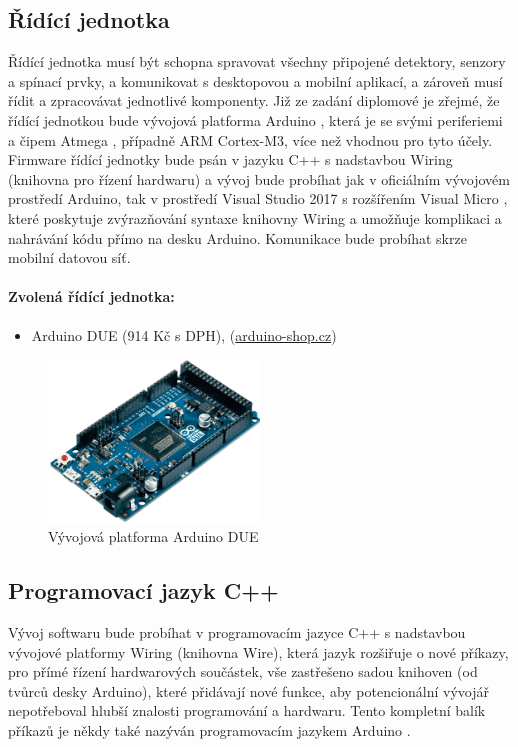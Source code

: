 \documentclass[FM,DP]{tulthesis}  %
\begin{document}
\subsection{Řídící jednotka}
Řídící jednotka musí být schopna spravovat všechny připojené detektory, senzory a spínací prvky, a komunikovat s desktopovou a mobilní aplikací, a zároveň musí řídit a zpracovávat jednotlivé komponenty. Již ze zadání diplomové je zřejmé, že řídící jednotkou bude vývojová platforma Arduino \cite{Pruvodce arduinem}, která je se svými periferiemi \cite{Arduino schematic} a čipem Atmega \cite{Atmega datasheet}, případně ARM Cortex-M3, více než vhodnou pro tyto účely. Firmware řídící jednotky bude psán v jazyku  C++ s nadstavbou Wiring (knihovna pro řízení hardwaru) \cite{Wiring} a vývoj bude probíhat jak v oficiálním vývojovém prostředí Arduino\cite{Arduino soft}, tak v prostředí Visual Studio 2017 s rozšířením Visual Micro \cite{Visual Micro}, které poskytuje zvýrazňování syntaxe knihovny Wiring a umožňuje komplikaci a nahrávání kódu přímo na desku Arduino. Komunikace bude probíhat skrze mobilní datovou síť.

\paragraph{Zvolená řídící jednotka:}
\begin{itemize}
\item Arduino DUE (914 Kč s DPH), (\url{arduino-shop.cz})
\end{itemize}

\begin{figure}[H]
\begin{center}
\includegraphics[width=0.5\textwidth]{images/arduinoDue.png}
\caption{Vývojová platforma Arduino DUE}
\label{image}
\end{center}
\end{figure}

\subsection{Programovací jazyk C++}
Vývoj softwaru bude probíhat v programovacím jazyce C++ s nadstavbou vývojové platformy Wiring (knihovna Wire)\cite{Arduino soft}, která jazyk rozšiřuje o nové příkazy, pro přímé řízení hardwarových součástek, vše zastřešeno sadou knihoven \cite{Arduino lib} (od tvůrců desky Arduino), které přidávají nové funkce, aby potencionální vývojář nepotřeboval hlubší znalosti programování a hardwaru. Tento kompletní balík příkazů \cite{Arduino lang} je někdy také nazýván programovacím jazykem Arduino \cite{Arduino intro}.
\end{document}

